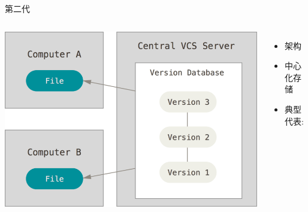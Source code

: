 \begin{frame}{第二代}
    \begin{columns}[onlytextwidth]
        \centering
        \includegraphics[scale=0.24]{figures/centralized.png}\\
        \begin{itemize}
            \item {}架构
            \item 中心化存储
            \item 典型代表:
        \end{itemize}
    \end{columns}
\end{frame}

